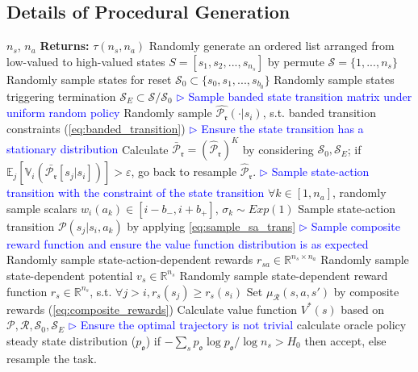 \documentclass{article}
\newcommand{\TCP}[1]{\textcolor{blue}{$\triangleright$ #1}}
\begin{document}
\subsection{Details of Procedural Generation} \label{sec:anymdp_task_empirical}
\begin{algorithm}[htbp]
   \caption{AnyMDP $TaskSampler$}
   \label{alg:task_sampler}
   \begin{algorithmic}[1]
    $n_s$, $n_a$ {\bfseries Returns:} $\tau(n_s, n_a)$
   \STATE Randomly generate an ordered list arranged from low-valued to high-valued states $S=[s_1,s_2,...,s_{n_s}]$ by permute $\mathcal{S}=\{1,...,n_s\}$
   \STATE Randomly sample states for reset $\mathcal{S}_0 \subset \{s_0, s_1, ...,s_{b_0}\}$
   \STATE Randomly sample states triggering termination $\mathcal{S}_E \subset \mathcal{S} / \mathcal{S}_0$
   \TCP{Sample banded state transition matrix under uniform random policy}
       \STATE  Randomly sample $\hat{\mathcal{P}_{\mathfrak{r}}}(\cdot|s_i)$, s.t. banded transition constraints (\cref{eq:banded_transition})
    \ENDFOR
    \TCP{Ensure the state transition has a stationary distribution}
    \STATE Calculate $\bar{\mathcal{P}}_{\mathfrak{r}}=(\hat{\mathcal{P}}_{\mathfrak{r}})^K$ by considering $\mathcal{S}_0, \mathcal{S}_E$; if $\mathbb{E}_j[\mathbb{V}_i(\bar{\mathcal{P}_{\mathfrak{r}}}[s_j|s_i])]>\varepsilon$, go back to resample $\hat{\mathcal{P}}_{\mathfrak{r}}$. \label{alg:line_ergodicity}
   \TCP{Sample state-action transition with the constraint of the state transition}
       \STATE $\forall k\in [1,n_a]$, randomly sample scalars $w_i(a_k) \in [i-b_{-}, i+{b_{+}}]$, $\sigma_k \sim Exp(1)$
       \STATE Sample state-action transition $\mathcal{P}(s_j|s_i, a_k)$ by applying \cref{eq:sample_sa_trans}
    \ENDFOR
    \TCP{Sample composite reward function and ensure the value function distribution is as expected}
    \STATE Randomly sample state-action-dependent rewards $r_{sa} \in \mathbb{R}^{n_s \times n_a}$
    \STATE Randomly sample state-dependent potential $v_s \in \mathbb{R}^{n_s}$
    \REPEAT
       \STATE Randomly sample state-dependent reward function $r_s \in \mathbb{R}^{n_s}$, s.t. $\forall j>i, r_{s}(s_j) \ge r_{s}(s_i)$
       \STATE Set $\mu_\mathcal{R}(s,a,s')$ by composite rewards (\cref{eq:composite_rewards})
       \STATE Calculate value function $V^*(s)$ based on $\mathcal{P}, \mathcal{R}, \mathcal{S}_0, \mathcal{S}_E$
    \TCP{Ensure the optimal trajectory is not trivial}
     calculate oracle policy steady state distribution ($p_{\mathfrak{o}}$)
    \STATE \hspace*{1.5cm} if $-\sum_s p_{\mathfrak{o}} \log{p_{\mathfrak{o}}} / \log{n_s} > H_0$ then accept, else resample the task.
    \end{algorithmic}
\end{algorithm}
\end{document}
